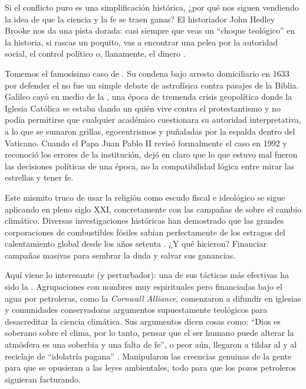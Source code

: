 Si el conflicto puro es una simplificación histórica, ¿por qué nos siguen vendiendo la idea de que la ciencia y la fe se traen ganas?
El historiador John Hedley Brooke nos da una pista dorada: casi siempre que veas un “choque teológico” en la historia, si rascas un poquito, vas a encontrar una pelea por la autoridad social, el control político o, llanamente, el dinero \cite{Brooke1991}.

Tomemos el famosísimo caso de .
Su condena bajo arresto domiciliario en 1633 por defender el  no fue un simple debate de astrofísica contra pasajes de la Biblia.
Galileo cayó en medio de la , una época de tremenda crisis geopolítica donde la Iglesia Católica se estaba dando un quién vive contra el protestantismo y no podía permitirse que cualquier académico cuestionara su autoridad interpretativa, a lo que se sumaron grillas, egocentrismos y puñaladas por la espalda dentro del Vaticano.
Cuando el Papa Juan Pablo II revisó formalmente el caso en 1992 y reconoció los errores de la institución, dejó en claro que lo que estuvo mal fueron las decisiones políticas de una época, no la compatibilidad lógica entre mirar las estrellas y tener fe.

Este mismito truco de usar la religión como escudo fiscal e ideológico se sigue aplicando en pleno siglo XXI, concretamente con las campañas de  sobre el cambio climático.
Diversas investigaciones históricas han demostrado que las grandes corporaciones de combustibles fósiles sabían perfectamente de los estragos del calentamiento global desde los años setenta \cite{Oreskes2010}.
¿Y qué hicieron?
Financiar campañas masivas para sembrar la duda y salvar sus ganancias.

Aquí viene lo interesante (y perturbador): una de sus tácticas más efectivas ha sido la .
Agrupaciones con nombres muy espirituales pero financiadas bajo el agua por petroleras, como la \emph{Cornwall Alliance}, comenzaron a difundir en iglesias y comunidades conservadoras argumentos supuestamente teológicos para desacreditar la ciencia climática.
Sus argumentos dicen cosas como: “Dios es soberano sobre el clima, por lo tanto, pensar que el ser humano puede alterar la atmósfera es una soberbia y una falta de fe”, o peor aún, llegaron a tildar al  y al reciclaje de “idolatría pagana” \cite{HultmanKall2019}.
Manipularon las creencias genuinas de la gente para que se opusieran a las leyes ambientales, todo para que los pozos petroleros siguieran facturando.

